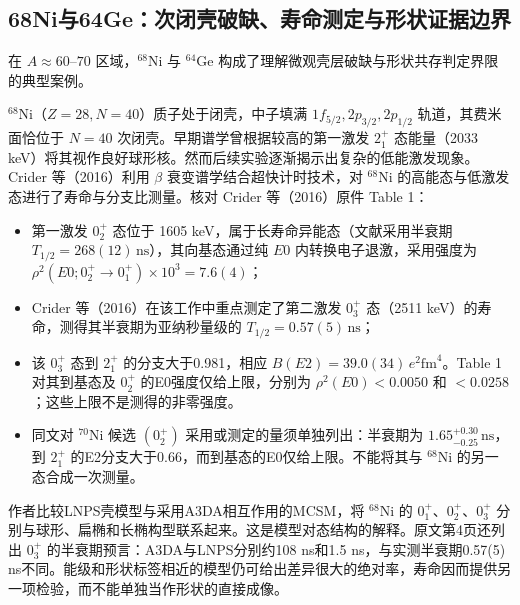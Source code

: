 \subsection{68Ni与64Ge：次闭壳破缺、寿命测定与形状证据边界}\label{sec:4-2-2}

在 $A\approx 60\text{--}70$ 区域，$^{68}\mathrm{Ni}$ 与 $^{64}\mathrm{Ge}$ 构成了理解微观壳层破缺与形状共存判定界限的典型案例。

$^{68}\mathrm{Ni}$（$Z=28, N=40$）质子处于闭壳，中子填满 $1f_{5/2}, 2p_{3/2}, 2p_{1/2}$ 轨道，其费米面恰位于 $N=40$ 次闭壳。早期谱学曾根据较高的第一激发 $2^+_1$ 态能量（2033 keV）将其视作良好球形核。然而后续实验逐渐揭示出复杂的低能激发现象。Crider 等（2016）\cite{crider-2016-68ni-shape-coexistence}利用 $\beta$ 衰变谱学结合超快计时技术，对 $^{68}\mathrm{Ni}$ 的高能态与低激发态进行了寿命与分支比测量。核对 Crider 等（2016）原件 Table 1：
\begin{itemize}
\item 第一激发 $0^+_2$ 态位于 1605 keV，属于长寿命异能态（文献采用半衰期 $T_{1/2} = 268(12)\,\mathrm{ns}$），其向基态通过纯 $E0$ 内转换电子退激，采用强度为 $\rho^2(E0; 0^+_2 \to 0^+_1) \times 10^3 = 7.6(4)$；
\item Crider 等（2016）在该工作中重点测定了第二激发 $0^+_3$ 态（2511 keV）的寿命，测得其半衰期为亚纳秒量级的 $T_{1/2} = 0.57(5)\,\mathrm{ns}$；
\item 该 $0_3^+$ 态到 $2_1^+$ 的分支大于0.981，相应 $B(E2)=39.0(34)\,e^2\mathrm{fm}^4$。Table 1对其到基态及 $0_2^+$ 的E0强度仅给上限，分别为 $\rho^2(E0)<0.0050$ 和 $<0.0258$；这些上限不是测得的非零强度。
\item 同文对 $^{70}\mathrm{Ni}$ 候选 $(0_2^+)$ 采用或测定的量须单独列出：半衰期为 $1.65^{+0.30}_{-0.25}\,\mathrm{ns}$，到 $2_1^+$ 的E2分支大于0.66，而到基态的E0仅给上限。不能将其与 $^{68}\mathrm{Ni}$ 的另一态合成一次测量。
\end{itemize}
作者比较LNPS壳模型与采用A3DA相互作用的MCSM，将 $^{68}\mathrm{Ni}$ 的 $0_1^+$、$0_2^+$、$0_3^+$ 分别与球形、扁椭和长椭构型联系起来。这是模型对态结构的解释。原文第4页还列出 $0_3^+$ 的半衰期预言：A3DA与LNPS分别约108 ns和1.5 ns，与实测半衰期0.57(5) ns不同。能级和形状标签相近的模型仍可给出差异很大的绝对率，寿命因而提供另一项检验，而不能单独当作形状的直接成像。


